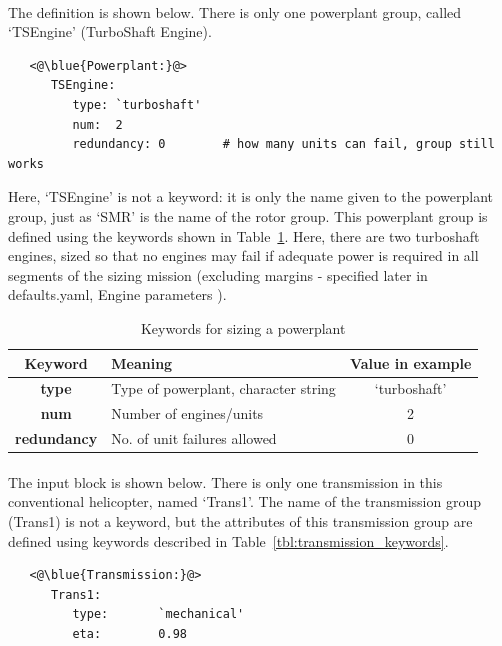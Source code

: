 \paragraph{}
The  definition is shown below. There is only one powerplant group, called `TSEngine' (TurboShaft Engine). 
\begin{lstlisting}
   <@\blue{Powerplant:}@>
      TSEngine: 
         type: `turboshaft'
         num:  2
         redundancy: 0        # how many units can fail, group still works
\end{lstlisting}
Here, `TSEngine' is not a keyword: it is only the name given to the powerplant group, just as `SMR' is the name of the rotor group. This powerplant group is defined using the keywords shown in Table~\ref{tbl:powerplant_keywords}. Here, there are two turboshaft engines, sized so that no engines may fail if adequate power is required in all segments of the sizing mission (excluding margins - specified later in defaults.yaml, Engine parameters ).

\begin{table}[H]
\begin{center}
	\caption{Keywords for sizing a powerplant}
	\label{tbl:powerplant_keywords}
    \begin{tabular}{| c | l | c |}
    \hline
    Keyword & Meaning & Value in example \\ 
    \hline
\textbf{type} & Type of powerplant, character string & `turboshaft' \\
\textbf{num} & Number of engines/units & 2  \\
\textbf{redundancy} & No. of unit failures allowed & 0 \\
    \hline
  \end{tabular}
\end{center}
\end{table}
\vspace{-1.5cm}

\paragraph{}
The  input block is shown below. There is only one transmission in this conventional helicopter, named `Trans1'. The name of the transmission group (Trans1) is not a keyword, but the attributes of this transmission group are defined using keywords described in Table~\ref{tbl:transmission_keywords}.

\begin{lstlisting}
   <@\blue{Transmission:}@>
      Trans1: 
         type:       `mechanical'
         eta:        0.98
\end{lstlisting}

